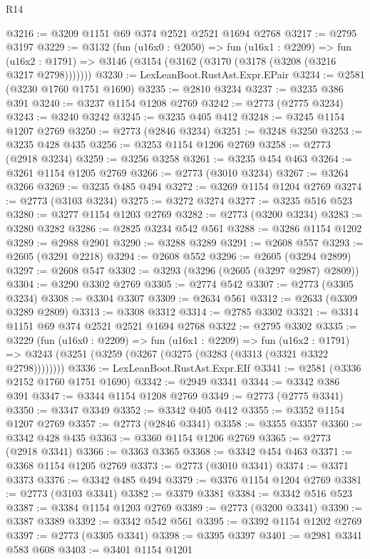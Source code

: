 \begin{lexlean}{R14}
\begin{coremodule}
@3216 := @3209 @1151 @69 @374 @2521 @2521 @1694 @2768
@3217 := @2795 @3197
@3229 := @3132
    (fun (u16x0 : @2050) =>
    fun (u16x1 : @2209) =>
    fun (u16x2 : @1791) => @3146 (@3154 (@3162 (@3170 (@3178 (@3208 (@3216 @3217 @2798)))))))
@3230 := LexLeanBoot.RustAst.Expr.EPair
@3234 := @2581 (@3230 @1760 @1751 @1690)
@3235 := @2810 @3234
@3237 := @3235 @386 @391
@3240 := @3237 @1154 @1208 @2769
@3242 := @2773 (@2775 @3234)
@3243 := @3240 @3242
@3245 := @3235 @405 @412
@3248 := @3245 @1154 @1207 @2769
@3250 := @2773 (@2846 @3234)
@3251 := @3248 @3250
@3253 := @3235 @428 @435
@3256 := @3253 @1154 @1206 @2769
@3258 := @2773 (@2918 @3234)
@3259 := @3256 @3258
@3261 := @3235 @454 @463
@3264 := @3261 @1154 @1205 @2769
@3266 := @2773 (@3010 @3234)
@3267 := @3264 @3266
@3269 := @3235 @485 @494
@3272 := @3269 @1154 @1204 @2769
@3274 := @2773 (@3103 @3234)
@3275 := @3272 @3274
@3277 := @3235 @516 @523
@3280 := @3277 @1154 @1203 @2769
@3282 := @2773 (@3200 @3234)
@3283 := @3280 @3282
@3286 := @2825 @3234 @542 @561
@3288 := @3286 @1154 @1202
@3289 := @2988 @2901
@3290 := @3288 @3289
@3291 := @2608 @557
@3293 := @2605 (@3291 @2218)
@3294 := @2608 @552
@3296 := @2605 (@3294 @2899)
@3297 := @2608 @547
@3302 := @3293 (@3296 (@2605 (@3297 @2987) @2809))
@3304 := @3290 @3302 @2769
@3305 := @2774 @542
@3307 := @2773 (@3305 @3234)
@3308 := @3304 @3307
@3309 := @2634 @561
@3312 := @2633 (@3309 @3289 @2809)
@3313 := @3308 @3312
@3314 := @2785 @3302
@3321 := @3314 @1151 @69 @374 @2521 @2521 @1694 @2768
@3322 := @2795 @3302
@3335 := @3229
    (fun (u16x0 : @2209) =>
    fun (u16x1 : @2209) =>
    fun (u16x2 : @1791) =>
    @3243 (@3251 (@3259 (@3267 (@3275 (@3283 (@3313 (@3321 @3322 @2798))))))))
@3336 := LexLeanBoot.RustAst.Expr.EIf
@3341 := @2581 (@3336 @2152 @1760 @1751 @1690)
@3342 := @2949 @3341
@3344 := @3342 @386 @391
@3347 := @3344 @1154 @1208 @2769
@3349 := @2773 (@2775 @3341)
@3350 := @3347 @3349
@3352 := @3342 @405 @412
@3355 := @3352 @1154 @1207 @2769
@3357 := @2773 (@2846 @3341)
@3358 := @3355 @3357
@3360 := @3342 @428 @435
@3363 := @3360 @1154 @1206 @2769
@3365 := @2773 (@2918 @3341)
@3366 := @3363 @3365
@3368 := @3342 @454 @463
@3371 := @3368 @1154 @1205 @2769
@3373 := @2773 (@3010 @3341)
@3374 := @3371 @3373
@3376 := @3342 @485 @494
@3379 := @3376 @1154 @1204 @2769
@3381 := @2773 (@3103 @3341)
@3382 := @3379 @3381
@3384 := @3342 @516 @523
@3387 := @3384 @1154 @1203 @2769
@3389 := @2773 (@3200 @3341)
@3390 := @3387 @3389
@3392 := @3342 @542 @561
@3395 := @3392 @1154 @1202 @2769
@3397 := @2773 (@3305 @3341)
@3398 := @3395 @3397
@3401 := @2981 @3341 @583 @608
@3403 := @3401 @1154 @1201

\end{coremodule}
\end{lexlean}
